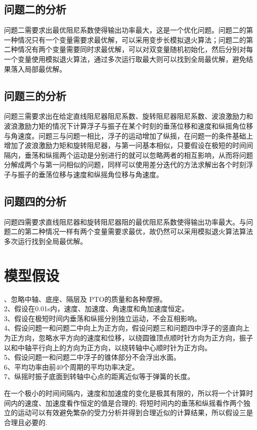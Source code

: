 \documentclass[a4paper,12pt]{article}
\begin{document}
	\subsection{问题二的分析}
	问题二需要求出最优阻尼系数使得输出功率最大，这是一个优化问题。问题二的第一种情况只有一个变量需要求最优解，可以采用变步长模拟退火算法；问题二的第二种情况有两个变量需要同时求最优解，可以对双变量随机初始化，然后分别对每一个变量使用模拟退火算法，通过多次运行取最大则可以找到全局最优解，避免结果落入局部最优解。
	\subsection{问题三的分析}
	问题三需要求出在给定直线阻尼器阻尼系数、旋转阻尼器阻尼系数、波浪激励力和波浪激励力矩的情况下计算浮子与振子在某个时刻的垂荡位移和速度和纵摇角位移与角速度。问题三与问题一相比，浮子的运动增加了纵摇，在问题一的条件基础上增加了波浪激励力矩和旋转阻尼器，与第一问基本相似，只要假设在极短的时间间隔内，垂荡和纵摇两个运动是分别进行的就可以忽略两者的相互影响，从而将问题分解成两个与第一问相似的问题，同样可以使用差分迭代的方法求解出各个时刻浮子与振子的垂荡位移与速度和纵摇角位移与角速度。
	\subsection{问题四的分析}
	问题四需要求直线阻尼器和旋转阻尼器阻的最优阻尼系数使得输出功率最大。与问题二的第二种情况一样有两个变量需要求最优，故仍然可以采用模拟退火算法算法多次运行找到全局最优解。
	\section{模型假设}
	、忽略中轴、底座、隔层及 PTO的质量和各种摩擦。\\
	2、假设在0.01s内，速度、加速度、角速度和角加速度恒定。\\
	3、假设在极短时间内垂荡和纵摇分别独立运动，不会互相影响。\\
	4、假设问题一和问题二中向上为正方向，假设问题三和问题四中浮子的竖直向上为正方向，忽略水平方向的速度和位移，以绕圆锥顶点顺时针方向为正方向，振子以和中轴平行向上的方向为正方向，以绕转轴中心顺时针为正方向。\\
	5、假设问题一和问题二中浮子的锥体部分不会浮出水面。\\
	6、平均功率由前40个周期的平均功率决定。\\
	7、纵摇时振子底面到转轴中心点的距离近似等于弹簧的长度。\par
	在一个极小的时间间隔内，速度和加速度的变化是极其有限的，所以将一个计算时间内的速度、加速度看作恒定的值是合理的;
	将短时间内的垂荡和纵摇看作两个独立的运动可以有效避免繁杂的受力分析并得到合理近似的计算结果，所以假设三是合理且必要的.
\end{document}

